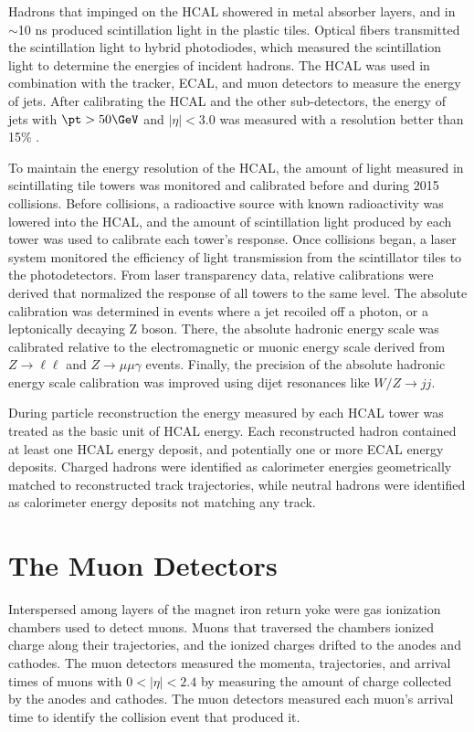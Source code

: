 Hadrons that impinged on the HCAL showered in metal absorber layers, and in $\sim$10 ns produced scintillation 
light in the plastic tiles.  Optical fibers transmitted the scintillation light to hybrid photodiodes, 
which measured the scintillation light to determine the energies of incident hadrons.  The HCAL was used in 
combination with the tracker, ECAL, and muon detectors to measure the energy of jets.  After calibrating the 
HCAL and the other sub-detectors, the energy of jets with $\pt > 50\GeV$ and $|\eta| < 3.0$ was measured with 
a resolution better than 15\% \cite{jetResolutionInCollisions}.

To maintain the energy resolution of the HCAL, the amount of light measured in scintillating tile towers 
was monitored and calibrated before and during 2015 collisions.  Before collisions, a radioactive source 
with known radioactivity was lowered into the HCAL, and the amount of scintillation light produced by each 
tower was used to calibrate each tower's response.  Once collisions began, a laser system 
monitored the efficiency of light transmission from the scintillator tiles to the photodetectors.  
From laser transparency data, relative calibrations were derived that normalized the response of all towers 
to the same level.  The absolute 
calibration was determined in events where a jet recoiled off a photon, or a leptonically decaying Z boson.  
There, the absolute hadronic energy 
scale was calibrated relative to the electromagnetic or muonic energy scale derived from $Z \rightarrow \ell\ell$ 
and $Z \rightarrow \mu\mu\gamma$ events.  Finally, the precision of the absolute hadronic energy scale calibration 
was improved using dijet resonances like $W/Z \rightarrow jj$.

During particle reconstruction the energy measured by each HCAL tower was treated as the basic unit of HCAL energy.  
Each reconstructed hadron contained at least one HCAL energy deposit, and potentially one or more ECAL energy 
deposits.  Charged hadrons were identified as calorimeter energies geometrically matched to reconstructed 
track trajectories, while neutral hadrons were identified as calorimeter energy deposits not matching any 
track.


\section{The Muon Detectors}
\label{sec:muonDetectorsDescription}
Interspersed among layers of the magnet iron return yoke were gas ionization chambers used to detect muons.  Muons 
that traversed the chambers ionized charge along their trajectories, and the ionized charges drifted to the 
anodes and cathodes.  The muon detectors measured the momenta, trajectories, and arrival times of muons with $0 < |\eta| < 2.4$ by 
measuring the amount of charge collected by the anodes and cathodes.  The muon detectors measured each muon's arrival 
time to identify the collision event that produced it.

